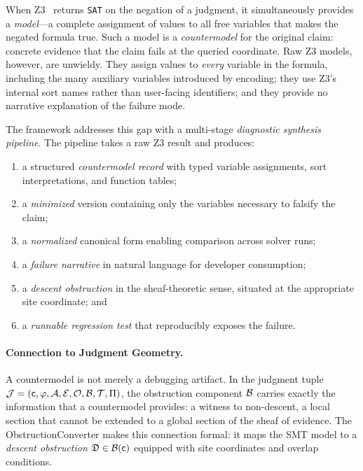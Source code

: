 \documentclass[11pt]{article}
\newcommand{\DO}{\mathfrak{D}}             %
\newcommand{\SAT}{\texttt{SAT}}
\begin{document}
When Z3~\cite{demoura2008} returns \SAT{} on the negation of a
\JuGeo{} judgment, it simultaneously provides a \emph{model}---a
complete assignment of values to all free variables that makes the
negated formula true.  Such a model is a \emph{countermodel} for the
original claim: concrete evidence that the claim fails at the queried
coordinate.  Raw Z3 models, however, are unwieldy.  They assign values
to \emph{every} variable in the formula, including the many auxiliary
variables introduced by encoding; they use Z3's internal sort names
rather than user-facing identifiers; and they provide no narrative
explanation of the failure mode.

The \JuGeo{} framework addresses this gap with a multi-stage
\emph{diagnostic synthesis pipeline}.  The pipeline takes a raw Z3
result and produces:
\begin{enumerate}[leftmargin=1.5em]
  \item a structured \emph{countermodel record} with typed variable
        assignments, sort interpretations, and function tables;
  \item a \emph{minimized} version containing only the variables
        necessary to falsify the claim;
  \item a \emph{normalized} canonical form enabling comparison across
        solver runs;
  \item a \emph{failure narrative} in natural language for developer
        consumption;
  \item a \emph{descent obstruction} in the sheaf-theoretic sense,
        situated at the appropriate site coordinate; and
  \item a \emph{runnable regression test} that reproducibly exposes the
        failure.
\end{enumerate}

\paragraph{Connection to Judgment Geometry.}
A countermodel is not merely a debugging artifact.  In the \JuGeo{}
judgment tuple
$\mathcal{J} = (\mathsf{c}, \varphi, \mathcal{A}, \mathcal{E}, \mathcal{O}, \mathcal{B}, \mathcal{T}, \Pi)$,
the obstruction component $\mathcal{B}$ carries exactly the information that
a countermodel provides: a witness to non-descent, a local section that
cannot be extended to a global section of the sheaf of evidence.  The
\textsf{ObstructionConverter} makes this connection formal: it maps the
SMT model to a \emph{descent obstruction} $\DO \in \obstr(\coord)$
equipped with site coordinates and overlap conditions.
\end{document}
